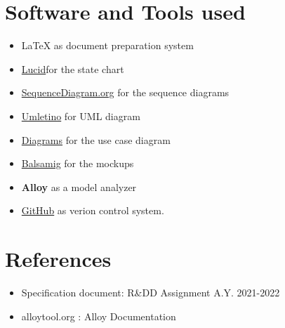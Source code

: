 \documentclass{article}
\begin{document}
\section{Software and Tools used}
\begin{itemize}
      \item \LaTeX{} as document preparation system
      \item \href{https://lucid.co/}{Lucid}for the state chart 
      \item \href{https://sequencediagram.org}{SequenceDiagram.org} for the sequence diagrams
      \item \href{http://www.umletino.com/umletino.html}{Umletino} for UML diagram 
      \item \href{https://app.diagrams.net/}{Diagrams} for the use case diagram 
      \item \href{https://balsamiq.com}{Balsamig} for the mockups 
      \item \textbf{Alloy} as a model analyzer
      \item \href{https://github.com/}{GitHub} as verion control system.
\end{itemize}


\section{References}
\begin{itemize}
      \item Specification document: R\&DD Assignment A.Y. 2021-2022
      \item alloytool.org : Alloy Documentation
\end{itemize}
\end{document}
